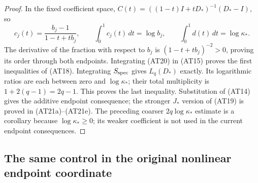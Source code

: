 \begin{proof}
In the fixed coefficient space,
$C(t)=((1-t)I+tD_*)^{-1}(D_*-I)$, so
\[
c_j(t)=\frac{b_j-1}{1-t+tb_j},\qquad
\int_0^1c_j(t)\,dt=\log b_j,\qquad
\int_0^1d(t)\,dt=\log\kappa_* .\tag{AT21}
\]
The derivative of the fraction with respect to $b_j$ is
$(1-t+tb_j)^{-2}>0$, proving its order through both endpoints.
Integrating (AT20) in (AT15) proves the first inequalities of
(AT18). Integrating $S_{\rm spec}$ gives $L_q(D_*)$ exactly.
Its logarithmic ratios are each between zero and $\log\kappa_*$;
their total multiplicity is $1+2(q-1)=2q-1$. This proves the last
inequality. Substitution of (AT14) gives the additive endpoint consequence;
the stronger $J_*$ version of (AT19) is proved in (AT21a)--(AT21e).
The preceding coarser $2q\log\kappa_*$ estimate is a corollary
because $\log\kappa_*\ge0$; its weaker coefficient is not used
in the current endpoint consequences.
\end{proof}

\subsection{The same control in the original nonlinear endpoint coordinate}

